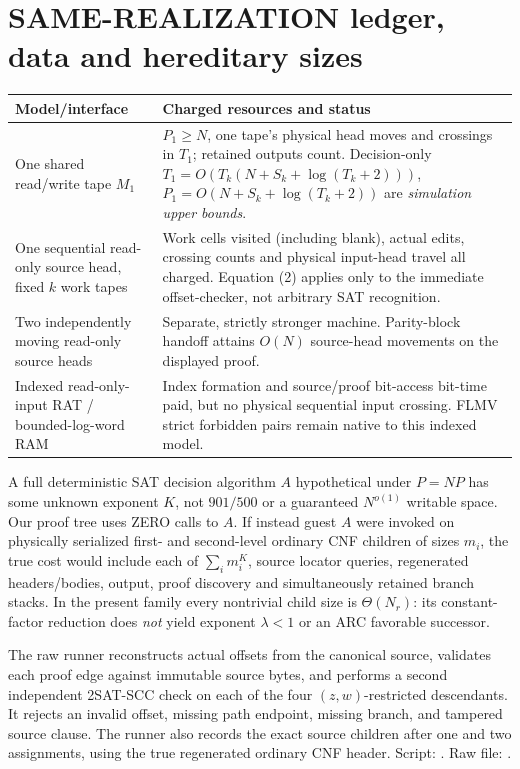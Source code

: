 \documentclass[11pt]{article}
\begin{document}
\section{SAME-REALIZATION ledger, data and hereditary sizes}
\begin{center}\small\begin{tabularx}{.97\linewidth}{p{.22\linewidth}X}
\toprule
Model/interface & Charged resources and status\\\midrule
One shared read/write tape $M_1$ & $P_1\ge N$, one tape's physical head moves and crossings in $T_1$; retained outputs count. Decision-only $T_1=O(T_k(N+S_k+\log(T_k+2)))$, $P_1=O(N+S_k+\log(T_k+2))$ are \emph{simulation upper bounds}.\\
One sequential read-only source head, fixed $k$ work tapes & Work cells visited (including blank), actual edits, crossing counts and physical input-head travel all charged. Equation (2) applies only to the immediate offset-checker, not arbitrary SAT recognition.\\
Two independently moving read-only source heads & Separate, strictly stronger machine. Parity-block handoff attains $O(N)$ source-head movements on the displayed proof.\\
Indexed read-only-input RAT / bounded-log-word RAM & Index formation and source/proof bit-access bit-time paid, but no physical sequential input crossing. FLMV strict forbidden pairs remain native to this indexed model.\\
\bottomrule\end{tabularx}\end{center}

A full deterministic SAT decision algorithm $A$ hypothetical under $P=NP$ has some unknown exponent $K$, not $901/500$ or a guaranteed $N^{o(1)}$ writable space. Our proof tree uses ZERO calls to $A$. If instead guest $A$ were invoked on physically serialized first- and second-level ordinary CNF children of sizes $m_i$, the true cost would include each of $\sum_i m_i^K$, source locator queries, regenerated headers/bodies, output, proof discovery and simultaneously retained branch stacks. In the present family every nontrivial child size is \(\Theta(N_r)\): its constant-factor reduction does \emph{not} yield exponent $\lambda<1$ or an ARC favorable successor.

The raw runner reconstructs actual offsets from the canonical source, validates each proof edge against immutable source bytes, and performs a second independent 2SAT-SCC check on each of the four $(z,w)$-restricted descendants. It rejects an invalid offset, missing path endpoint, missing branch, and tampered source clause. The runner also records the exact source children after one and two assignments, using the true regenerated ordinary CNF header. Script:
. Raw file:
.
\end{document}

